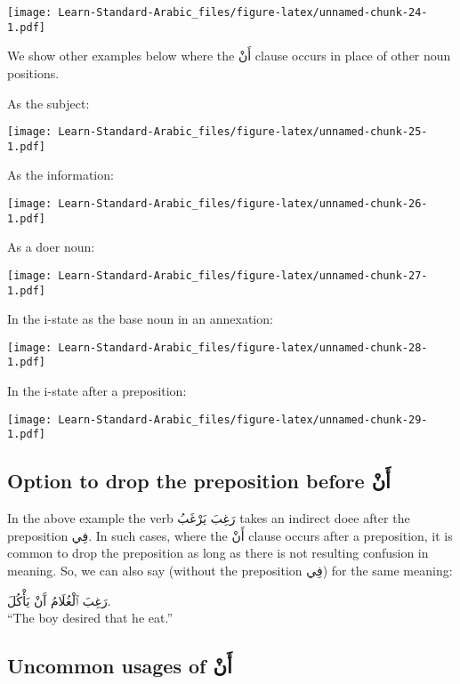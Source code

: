 \documentclass[
  10pt,
]{book}
\begin{document}
\texttt{[image: Learn-Standard-Arabic\_files/figure-latex/unnamed-chunk-24-1.pdf]}

We show other examples below where the
\foreignlanguage{arabic}{أَنْ} clause
occurs in place of other noun positions.

As the subject:

\texttt{[image: Learn-Standard-Arabic\_files/figure-latex/unnamed-chunk-25-1.pdf]}

As the information:

\texttt{[image: Learn-Standard-Arabic\_files/figure-latex/unnamed-chunk-26-1.pdf]}

As a doer noun:

\texttt{[image: Learn-Standard-Arabic\_files/figure-latex/unnamed-chunk-27-1.pdf]}

In the i-state as the base noun in an annexation:

\texttt{[image: Learn-Standard-Arabic\_files/figure-latex/unnamed-chunk-28-1.pdf]}

In the i-state after a preposition:

\texttt{[image: Learn-Standard-Arabic\_files/figure-latex/unnamed-chunk-29-1.pdf]}

\subsection{\texorpdfstring{Option to drop the preposition before \foreignlanguage{arabic}{أَنْ}}{Option to drop the preposition before أَنْ}}\label{option-to-drop-the-preposition-before-ux623ux646}

In the above example the verb \foreignlanguage{arabic}{رَغِبَ يَرْغَبُ} takes an indirect doee after the preposition \foreignlanguage{arabic}{فِي}.
In such cases, where the
\foreignlanguage{arabic}{أَنْ} clause
occurs after a preposition, it is common to drop the preposition as long as there is not resulting confusion in meaning.
So, we can also say (without the preposition \foreignlanguage{arabic}{فِي}) for the same meaning:

\foreignlanguage{arabic}{رَغِبَ ٱلْغُلَامُ آَنْ يَأْکُلَ.}\\
\enquote{The boy desired that he eat.}

\subsection{\texorpdfstring{Uncommon usages of \foreignlanguage{arabic}{أَنْ}}{Uncommon usages of أَنْ}}\label{uncommon-usages-of-ux623ux646}
\end{document}

